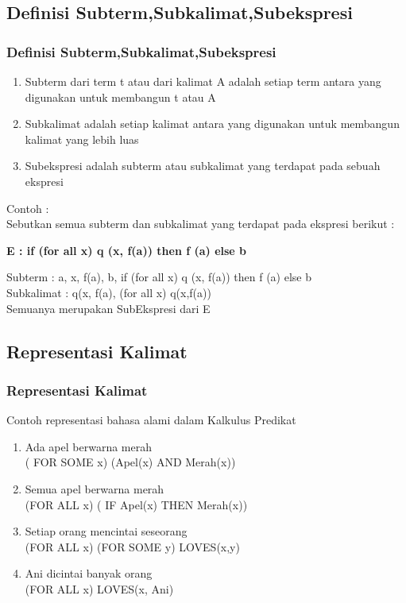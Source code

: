 \documentclass[handout]{beamer}
\theoremstyle{definition}
\theoremstyle{example}
\begin{document}
\subsection{Definisi Subterm,Subkalimat,Subekspresi}
\begin{frame}
	\frametitle{Definisi Subterm,Subkalimat,Subekspresi}
	 \begin{enumerate} 
	 	\item  Subterm dari term t atau dari kalimat A adalah setiap term antara yang digunakan untuk membangun t atau A
	 	\item  Subkalimat adalah setiap kalimat antara yang digunakan untuk membangun kalimat yang lebih luas
	 	\item  Subekspresi adalah subterm atau subkalimat yang terdapat	pada sebuah ekspresi
     \end{enumerate}
     Contoh :\\
     Sebutkan semua subterm dan subkalimat yang terdapat pada ekspresi berikut :\\
     \begin{center}
     	\textbf{E : if (for all x) q (x, f(a)) then f (a) else b}
     \end{center}
     Subterm : a, x, f(a), b, if (for all x) q (x, f(a)) then f (a) else b\\
     Subkalimat : q(x, f(a), (for all x) q(x,f(a))\\
     Semuanya merupakan SubEkspresi dari E\\
\end{frame}	

\subsection{Representasi Kalimat}
\begin{frame}
	\frametitle{Representasi Kalimat}
      Contoh representasi bahasa alami dalam Kalkulus Predikat\\
      \begin{enumerate} 
      	\item  {\color{red} Ada} apel berwarna merah\\
      ({\color{red} FOR SOME x}) (Apel(x) AND Merah(x))
        \item  {\color{red} Semua} apel berwarna merah\\
         ({\color{red}FOR ALL x}) ( IF Apel(x) THEN Merah(x))
        \item {\color{red}Setiap} orang mencintai {\color{blue}seseorang}\\
        ({\color{red}FOR ALL x}) ({\color{blue}FOR SOME y}) LOVES(x,y) 
        \item Ani dicintai {\color{red}banyak} orang\\
        ({\color{red}FOR ALL x}) LOVES(x, Ani)
  \end{enumerate}  
 \end{frame}
        
\end{document}
